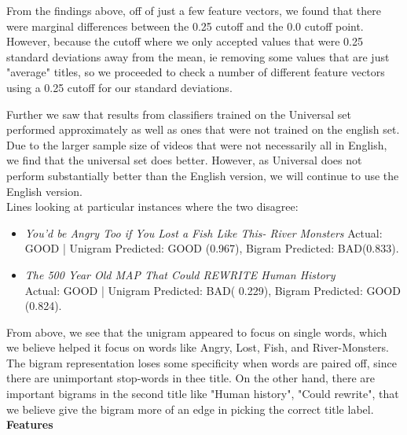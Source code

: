 \documentclass[a4paper,12pt]{article}
\begin{document}
From the findings above, off of just a few feature vectors, we found that there were marginal differences between the 0.25 cutoff and the 0.0 cutoff point. However, because the cutoff where we only accepted values that were 0.25 standard deviations away from the mean, ie removing some values that are just "average" titles, so we proceeded to check a number of different feature vectors using a 0.25 cutoff for our standard deviations. 

Further we saw that results from classifiers trained on the Universal set performed approximately as well as ones that were not trained on the english set. Due to the larger sample size of videos that were not necessarily all in English, we find that the universal set does better. However, as Universal does not perform substantially better than the English version, we will continue to use the English version.\\


Lines looking at particular instances where the two disagree:\\
\begin{itemize}
		\item \textit{You'd be Angry Too if You Lost a Fish Like This- River Monsters}
		 Actual: GOOD | Unigram Predicted: GOOD (0.967), Bigram Predicted: BAD(0.833).
		 
	
	\item \textit{The 500 Year Old MAP That Could REWRITE Human History }\\
	 Actual: GOOD | Unigram Predicted: BAD( 0.229), Bigram Predicted: GOOD (0.824).
 
 \end{itemize}

From above, we see that the unigram appeared to focus on single words, which we believe helped it focus on words like Angry, Lost, Fish, and River-Monsters. The bigram representation loses some specificity when words are paired off, since there are unimportant stop-words in thee title. On the other hand, there are important bigrams in the second title like "Human history", "Could rewrite", that we believe give the bigram more of an edge in picking the correct title label.\\


\textbf{Features}
\end{document}
